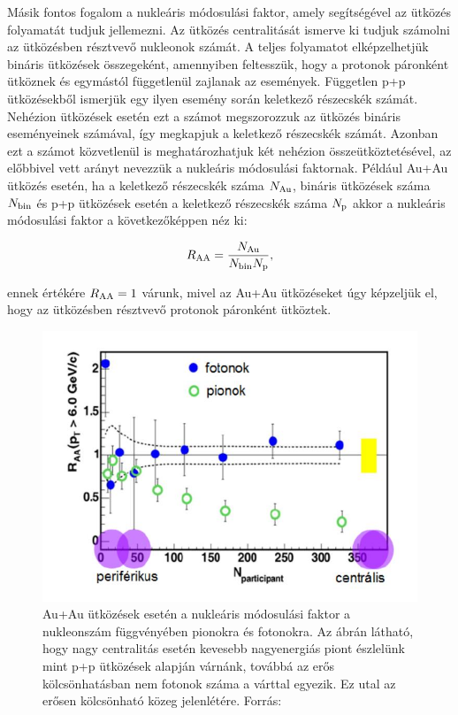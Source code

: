 \documentclass[11pt,a4paper]{article}
\numberwithin{equation}{subsection}
\numberwithin{figure}{section}
\begin{document}
Másik fontos fogalom a nukleáris módosulási faktor, amely segítségével az ütközés folyamatát tudjuk jellemezni. Az ütközés centralitását ismerve ki tudjuk számolni az ütközésben résztvevő nukleonok számát. A teljes folyamatot elképzelhetjük bináris ütközések összegeként, amennyiben feltesszük, hogy a protonok páronként ütköznek és egymástól függetlenül zajlanak az események. Független p+p ütközésekből ismerjük egy ilyen esemény során keletkező részecskék számát. Nehézion ütközések esetén ezt a számot megszorozzuk az ütközés bináris eseményeinek számával, így megkapjuk a keletkező részecskék számát. Azonban ezt a számot közvetlenül is meghatározhatjuk két nehézion összeütköztetésével, az előbbivel vett arányt nevezzük a nukleáris módosulási faktornak. Például Au+Au ütközés esetén, ha a keletkező részecskék száma $N_{{\rm Au}}$, bináris ütközések száma $N_{{\rm bin}}$ és p+p ütközések esetén a keletkező részecskék száma $N_{{\rm p}}$ akkor a nukleáris módosulási faktor a következőképpen néz ki:
\begin{large}
\begin{equation}
R_{\rm AA}=\frac{N_{\rm Au}}{N_{\rm bin}N_{\rm p}},
\label{eq:e1}
\end{equation}
\end{large}
ennek értékére  $R_{\rm AA}=1$ várunk, mivel az Au+Au ütközéseket úgy képzeljük el, hogy az ütközésben résztvevő protonok páronként ütköztek.  

\begin{center}
\begin{figure}[H]
\centering
\includegraphics[scale=0.6]{pic/int/p1}
 \caption{Au+Au ütközések esetén a nukleáris módosulási faktor a nukleonszám függvényében pionokra és fotonokra. Az ábrán látható, hogy nagy centralitás esetén kevesebb nagyenergiás piont észlelünk mint p+p ütközések alapján várnánk, továbbá az erős kölcsönhatásban nem 
  fotonok száma a várttal egyezik. Ez utal az erősen kölcsönható közeg jelenlétére. Forrás: ~\cite{CsanadHabil}}
\label{fig:mmf}
\end{figure}
\end{center}
\end{document}
